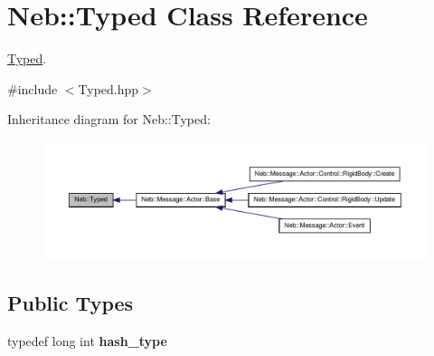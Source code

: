 \hypertarget{classNeb_1_1Typed}{\section{\-Neb\-:\-:\-Typed \-Class \-Reference}
\label{classNeb_1_1Typed}
}


\hyperlink{classNeb_1_1Typed}{\-Typed}.  




{\ttfamily \#include $<$\-Typed.\-hpp$>$}



\-Inheritance diagram for \-Neb\-:\-:\-Typed\-:\nopagebreak
\begin{figure}[H]
\begin{center}
\leavevmode
\includegraphics[width=350pt]{classNeb_1_1Typed__inherit__graph}
\end{center}
\end{figure}
\subsection*{\-Public \-Types}
\begin{DoxyCompactItemize}
\item 
\hypertarget{classNeb_1_1Typed_a8232d82e43986c8c95180aa17d848c32}{typedef long int {\bfseries hash\-\_\-type}}\label{classNeb_1_1Typed_a8232d82e43986c8c95180aa17d848c32}

\end{DoxyCompactItemize}

